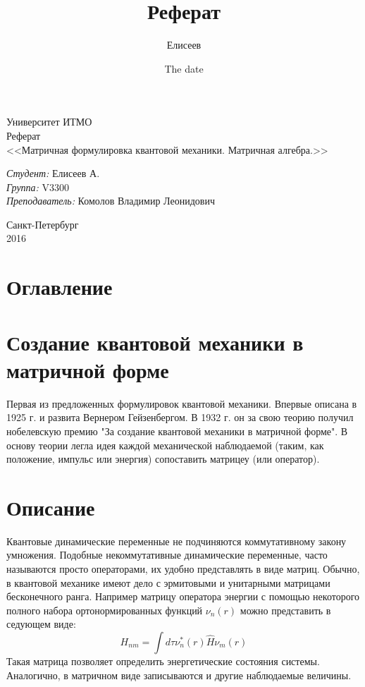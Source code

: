 \documentclass[a4paper,12pt]{article}
\title{Реферат}
\author{Елисеев}
\date{The date}
\begin{document}
	\begin{titlepage}
		\begin{center}
			\large Университет ИТМО\\[6cm]
			\huge Реферат\\[0.6cm]
			\large <<Матричная формулировка квантовой механики. Матричная алгебра.>>\\[8cm]
			\begin{flushleft}
				\emph{Студент:} Елисеев А.\\
				\emph{Группа:} V3300\\
				\emph{Преподаватель:} Комолов Владимир Леонидович\\
			\end{flushleft}
			\vfill
			\large Санкт-Петербург\\
			\large 2016
		\end{center}
		\thispagestyle{empty} %
	\end{titlepage}
	\section{Оглавление}
	\tableofcontents
	\newpage
	\section{Создание квантовой механики в матричной форме}
	Первая из предложенных формулировок квантовой механики. Впервые описана в 1925 г. и развита Вернером
Гейзенбергом. В 1932 г. он за свою теорию получил нобелевскую премию "За создание квантовой механики в матричной форме". В основу теории легла идея каждой механической наблюдаемой (таким, как
положение, импульс или энергия) сопоставить матрицеу (или оператор).
	\section{Описание}
	Квантовые динамические переменные не подчиняются коммутативному закону умножения. Подобные некоммутативные динамические переменные, часто называются просто операторами, их удобно представлять в виде матриц. Обычно, в квантовой механике имеют дело с эрмитовыми и унитарными матрицами бесконечного ранга. Например матрицу оператора энергии с помощью некоторого полного набора ортонормированных функций $\nu_{n}(r)$ можно представить в седующем виде:
	\begin{equation}
		H_{nm}=\int d\tau \nu ^{*}_{n}(r)\hat{H} \nu_{m}(r)  
	\end{equation}
	Такая матрица позволяет определить энергетические состояния системы. Аналогично, в матричном виде записываются и другие наблюдаемые величины.
\end{document}
